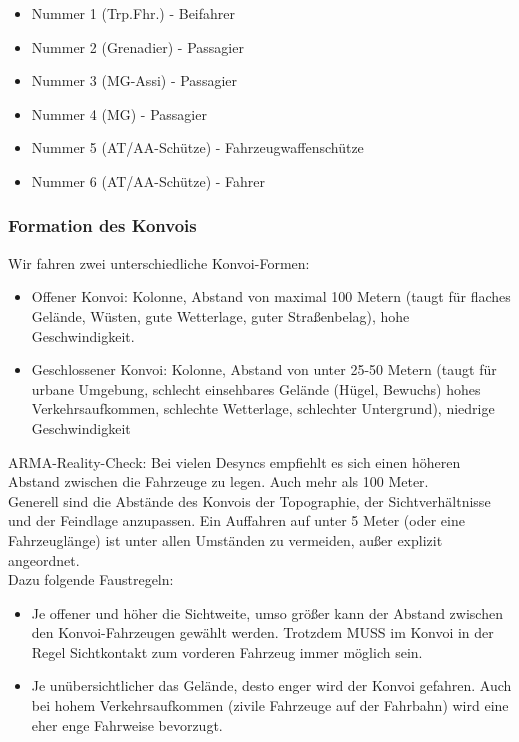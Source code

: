 	\begin{itemize}
		\item Nummer 1 (Trp.Fhr.) - Beifahrer
		\item Nummer 2 (Grenadier) - Passagier
		\item Nummer 3 (MG-Assi) - Passagier
		\item Nummer 4 (MG) - Passagier
		\item Nummer 5 (AT/AA-Schütze) - Fahrzeugwaffenschütze
		\item Nummer 6 (AT/AA-Schütze) - Fahrer
	\end{itemize}

\subsubsection{Formation des Konvois}
	Wir fahren zwei unterschiedliche Konvoi-Formen:
	\begin{itemize}
		\item Offener Konvoi: Kolonne, Abstand von maximal 100 Metern (taugt für flaches Gelände, Wüsten, gute Wetterlage, guter Straßenbelag), hohe Geschwindigkeit.
		\item Geschlossener Konvoi: Kolonne, Abstand von unter 25-50 Metern (taugt für urbane Umgebung, schlecht einsehbares Gelände (Hügel, Bewuchs) hohes Verkehrsaufkommen, schlechte Wetterlage, schlechter Untergrund), niedrige Geschwindigkeit
	\end{itemize}

	ARMA-Reality-Check: Bei vielen Desyncs empfiehlt es sich einen höheren Abstand zwischen die Fahrzeuge zu legen. Auch mehr als 100 Meter. \\
	Generell sind die Abstände des Konvois der Topographie, der Sichtverhältnisse und der Feindlage anzupassen. Ein Auffahren auf unter 5 Meter (oder eine Fahrzeuglänge) ist unter allen Umständen zu vermeiden, außer explizit angeordnet. \\
	Dazu folgende Faustregeln:

	\begin{itemize}
		\item Je offener und höher die Sichtweite, umso größer kann der Abstand zwischen den Konvoi-Fahrzeugen gewählt werden. Trotzdem MUSS im Konvoi in der Regel Sichtkontakt zum vorderen Fahrzeug immer möglich sein.
		\item Je unübersichtlicher das Gelände, desto enger wird der Konvoi gefahren. Auch bei hohem Verkehrsaufkommen (zivile Fahrzeuge auf der Fahrbahn) wird eine eher enge Fahrweise bevorzugt.
	\end{itemize}

